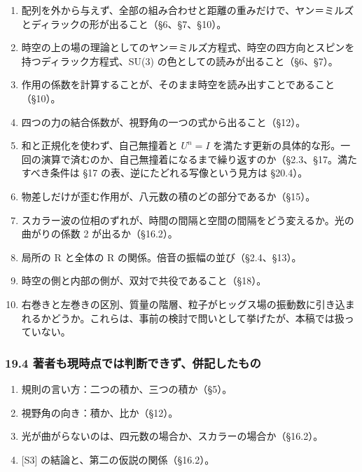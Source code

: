 \documentclass[
  a4paper,
]{ltjsarticle}
\providecommand{\tightlist}{%
  \setlength{\itemsep}{0pt}\setlength{\parskip}{0pt}}
\begin{document}
\begin{enumerate}
\def\labelenumi{\arabic{enumi}.}
\tightlist
\item
  配列を外から与えず、全部の組み合わせと距離の重みだけで、ヤン＝ミルズとディラックの形が出ること（§6、§7、§10）。
\item
  時空の上の場の理論としてのヤン＝ミルズ方程式、時空の四方向とスピンを持つディラック方程式、SU(3)
  の色としての読みが出ること（§6、§7）。
\item
  作用の係数を計算することが、そのまま時空を読み出すことであること（§10）。
\item
  四つの力の結合係数が、視野角の一つの式から出ること（§12）。
\item
  和と正規化を使わず、自己無撞着と \(U^n = I\)
  を満たす更新の具体的な形。一回の演算で済むのか、自己無撞着になるまで繰り返すのか（§2.3、§17。満たすべき条件は
  §17 の表、逆にたどれる写像という見方は §20.4）。
\item
  物差しだけが歪む作用が、八元数の積のどの部分であるか（§15）。
\item
  スカラー波の位相のずれが、時間の間隔と空間の間隔をどう変えるか。光の曲がりの係数
  2 が出るか（§16.2）。
\item
  局所の R と全体の R の関係。倍音の振幅の並び（§2.4、§13）。
\item
  時空の側と内部の側が、双対で共役であること（§18）。
\item
  右巻きと左巻きの区別、質量の階層、粒子がヒッグス場の振動数に引き込まれるかどうか。これらは、事前の検討で問いとして挙げたが、本稿では扱っていない。
\end{enumerate}

\subsubsection{19.4
著者も現時点では判断できず、併記したもの}\label{ux8457ux8005ux3082ux73feux6642ux70b9ux3067ux306fux5224ux65adux3067ux304dux305aux4f75ux8a18ux3057ux305fux3082ux306e}

\begin{enumerate}
\def\labelenumi{\arabic{enumi}.}
\tightlist
\item
  規則の言い方：二つの積か、三つの積か（§5）。
\item
  視野角の向き：積か、比か（§12）。
\item
  光が曲がらないのは、四元数の場合か、スカラーの場合か（§16.2）。
\item
  {[}S3{]} の結論と、第二の仮説の関係（§16.2）。
\end{enumerate}
\end{document}
